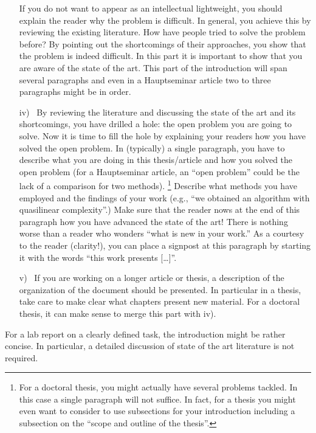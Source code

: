 \begin{enumerate}
               If you do not want to appear as an intellectual lightweight, you should explain the reader why the problem is difficult.
               In general, you achieve this by reviewing the existing literature.
               How have people tried to solve the problem before?
               By pointing out the shortcomings of their approaches, you show that the problem is indeed difficult.
               In this part it is important to show that you are aware of the state of the art. 
               This part of the introduction will span several paragraphs and even in a Hauptseminar article two to three paragraphs might be in order.
     \item[iv)~] By reviewing the literature and discussing the state of the art and its shortcomings, you have drilled a hole: 
                the open problem you are going to solve.
                Now it is time to fill the hole by explaining your readers how you have solved the open problem.
                In (typically) a single paragraph, you have to describe what you are doing in this thesis/article and how you solved the open problem (for a Hauptseminar article, an ``open problem'' could be the lack of a comparison for two methods).
                \footnote{For a doctoral thesis, you might actually have several problems tackled. 
                In this case a single paragraph will not suffice.
                In fact, for a thesis you might even want to consider to use subsections for your introduction including a subsection on the ``scope and outline of the thesis''.}    
                Describe what methods you have employed and the findings of your work (e.g., ``we obtained an algorithm with quasilinear complexity''.)
                Make sure that the reader nows at the end of this paragraph how you have advanced the state of the art!
                There is nothing worse than a reader who wonders ``what is new in your work.''
                As a courtesy to the reader (clarity!), you can place a signpost at this paragraph by starting it with the words ``this work presents [\dots]''.
      \item[v)~] If you are working on a longer article or thesis, a description of the organization of the document should be presented. 
                In particular in a thesis, take care to make clear what chapters present new material. For a doctoral thesis, it can make sense to merge this part with iv).
\end{enumerate}

For a lab report on a clearly defined task, the introduction might be rather concise. 
In particular, a detailed discussion of state of the art literature is not required. 
	

